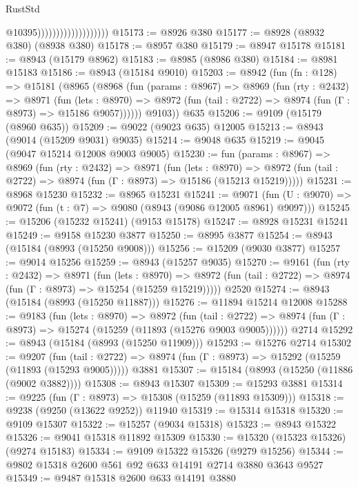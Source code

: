 \begin{lexlean}{RustStd}
\begin{coremodule}
{\begin{coremodule}
{{{{{{{{{{{{{{{{{{{{{{{{{{{{{{{{{{{{{{{                                          @10395)))))))))))))))))))
@15173 := @8926 @380
@15177 := @8928 (@8932 @380) (@8938 @380)
@15178 := @8957 @380
@15179 := @8947 @15178
@15181 := @8943 (@15179 @8962)
@15183 := @8985 (@8986 @380)
@15184 := @8981 @15183
@15186 := @8943 (@15184 @9010)
@15203 := @8942
    (fun (fn : @128) =>
    @15181
      (@8965
        (@8968
          (fun (params : @8967) =>
          @8969
            (fun (rty : @2432) =>
            @8971
              (fun (lets : @8970) =>
              @8972 (fun (tail : @2722) => @8974 (fun (Γ : @8973) => @15186 @9057))))))
        @9103))
    @635
@15206 := @9109 (@15179 (@8960 @635))
@15209 := @9022 (@9023 @635) @12005
@15213 := @8943 (@9014 (@15209 @9031) @9035)
@15214 := @9048 @635
@15219 := @9045 (@9047 @15214 @12008 @9003 @9005)
@15230 := fun (params : @8967) =>
  @8969
    (fun (rty : @2432) =>
    @8971
      (fun (lets : @8970) =>
      @8972 (fun (tail : @2722) => @8974 (fun (Γ : @8973) => @15186 (@15213 @15219)))))
@15231 := @8968 @15230
@15232 := @8965 @15231
@15241 := @9071
    (fun (U : @9070) => @9072 (fun (t : @7) => @9080 (@8943 (@9086 @12005 @8961) @9097)))
@15245 := @15206 (@15232 @15241) (@9153 @15178)
@15247 := @8928 @15231 @15241
@15249 := @9158 @15230 @3877
@15250 := @8995 @3877
@15254 := @8943 (@15184 (@8993 (@15250 @9008)))
@15256 := @15209 (@9030 @3877)
@15257 := @9014 @15256
@15259 := @8943 (@15257 @9035)
@15270 := @9161
    (fun (rty : @2432) =>
    @8971
      (fun (lets : @8970) =>
      @8972 (fun (tail : @2722) => @8974 (fun (Γ : @8973) => @15254 (@15259 @15219)))))
    @2520
@15274 := @8943 (@15184 (@8993 (@15250 @11887)))
@15276 := @11894 @15214 @12008
@15288 := @9183
    (fun (lets : @8970) =>
    @8972
      (fun (tail : @2722) =>
      @8974 (fun (Γ : @8973) => @15274 (@15259 (@11893 (@15276 @9003 @9005))))))
    @2714
@15292 := @8943 (@15184 (@8993 (@15250 @11909)))
@15293 := @15276 @2714
@15302 := @9207
    (fun (tail : @2722) => @8974 (fun (Γ : @8973) => @15292 (@15259 (@11893 (@15293 @9005)))))
    @3881
@15307 := @15184 (@8993 (@15250 (@11886 (@9002 @3882))))
@15308 := @8943 @15307
@15309 := @15293 @3881
@15314 := @9225 (fun (Γ : @8973) => @15308 (@15259 (@11893 @15309)))
@15318 := @9238 (@9250 (@13622 @9252)) @11940
@15319 := @15314 @15318
@15320 := @9109 @15307
@15322 := @15257 (@9034 @15318)
@15323 := @8943 @15322
@15326 := @9041 @15318 @11892 @15309
@15330 := @15320 (@15323 @15326) (@9274 @15183)
@15334 := @9109 @15322 @15326 (@9279 @15256)
@15344 := @9802 @15318 @2600 @561 @92 @633 @14191 @2714 @3880 @3643 @9527
@15349 := @9487 @15318 @2600 @633 @14191 @3880
}}}}}}}}}}}}}}}}}}}}}}}}}}}}}}}}}}}}}}}
\end{coremodule}}
\end{coremodule}
\end{lexlean}

